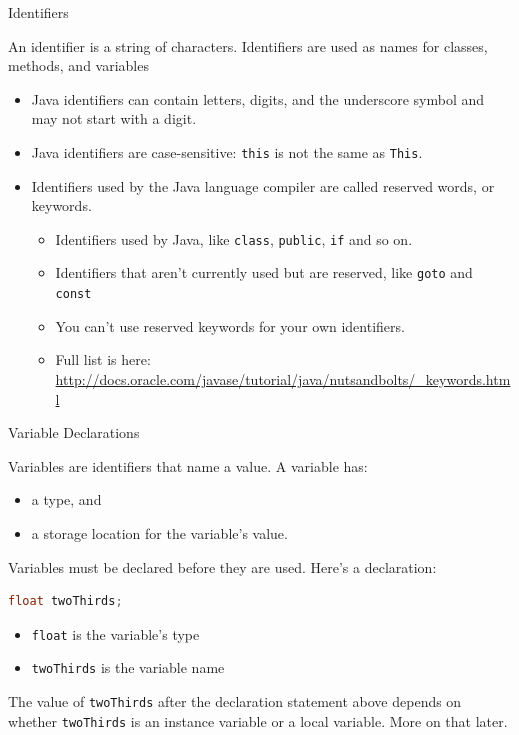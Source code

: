 \documentclass{beamer}
\begin{document}
\begin{frame}[fragile]{Identifiers}


An identifier is a string of characters.  Identifiers are used as names for classes, methods, and variables
\begin{itemize}
\item Java identifiers can contain letters, digits, and the underscore symbol and may not start with a digit.
\item Java identifiers are case-sensitive:  {\tt this} is not the same as {\tt This}.
\item Identifiers used by the Java language compiler are called reserved words, or keywords.
\begin{itemize}
\item Identifiers used by Java, like {\tt class}, {\tt public}, {\tt if} and so on.
\item Identifiers that aren't currently used but are reserved, like {\tt goto} and {\tt const}
\item You can't use reserved keywords for your own identifiers.
\item Full list is here: \url{http://docs.oracle.com/javase/tutorial/java/nutsandbolts/_keywords.html}
\end{itemize}

\end{itemize}


\end{frame}

\begin{frame}[fragile]{Variable Declarations}


Variables are identifiers that name a value. A variable has:
\begin{itemize}
\item a type, and
\item a storage location for the variable's value.
\end{itemize}

Variables must be declared before they are used.  Here's a declaration:
\begin{lstlisting}[language=Java]
float twoThirds;
\end{lstlisting}
\begin{itemize}
\item {\tt float} is the variable's type
\item {\tt twoThirds} is the variable name
\end{itemize}
The value of {\tt twoThirds} after the declaration statement above depends on whether {\tt twoThirds} is an instance variable or a local variable.  More on that later.

\end{frame}
\end{document}

